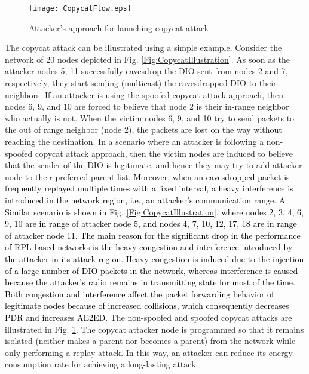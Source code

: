 \documentclass[]{svjour3}                     %
\begin{document}
\begin{figure}[!h]
	\centering
	\texttt{[image: CopycatFlow.eps]}
	\caption{Attacker's approach for launching copycat attack}
	\label{Fig:CopycatFlow}
\end{figure}



The copycat attack can be illustrated using a simple example. Consider the network of 20 nodes depicted in Fig. \ref{Fig:CopycatIllustration}. As soon as the attacker nodes 5, 11 successfully eavesdrop the DIO sent from nodes 2 and 7, respectively, they start sending (multicast) the eavesdropped DIO to their neighbors. If an attacker is using the spoofed copycat attack approach, then nodes 6, 9, and 10 are forced to believe that node 2 is their in-range neighbor who actually is not. When the victim nodes 6, 9, and 10 try to send packets to the out of range neighbor (node 2), the packets are lost on the way without reaching the destination. In a scenario where an attacker is following a non-spoofed copycat attack approach, then the victim nodes are induced to believe that the sender of the DIO is legitimate, and hence they may try to add attacker node to their preferred parent list. \textcolor{black}{Moreover, when an eavesdropped packet is frequently replayed multiple times with a fixed interval, a heavy interference is introduced in the network region, i.e., an attacker's communication range. A Similar scenario is shown in Fig. \ref{Fig:CopycatIllustration}, where nodes 2, 3, 4, 6, 9, 10 are in range of attacker node 5, and nodes 4, 7, 10, 12, 17, 18 are in range of attacker node 11.} \textcolor{black}{The main reason for the significant drop in the performance of RPL based networks is the heavy congestion and interference introduced by the attacker in its attack region. Heavy congestion is induced due to the injection of a large number of DIO packets in the network, whereas interference is caused because the attacker's radio remains in transmitting state for most of the time. Both congestion and interference affect the packet forwarding behavior of legitimate nodes because of increased collisions, which consequently decreases PDR and increases AE2ED.} The non-spoofed and spoofed copycat attacks are illustrated in Fig. \ref{Fig:CopycatFlow}. The copycat attacker node is programmed so that it remains isolated (neither makes a parent nor becomes a parent) from the network while only performing a replay attack. In this way, an attacker can reduce its energy consumption rate for achieving a long-lasting attack.                
\end{document}
